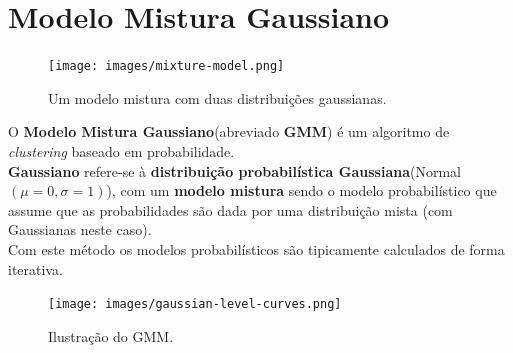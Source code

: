 \documentclass[]{report}
\begin{document}
\section{Modelo Mistura Gaussiano}
\begin{figure}
    \begin{center}
        \vspace{-20pt}
        \texttt{[image: images/mixture-model.png]}
        \caption{Um modelo mistura com duas distribuições gaussianas.}
    \end{center}
    \vspace{-50pt}
\end{figure}
O \textbf{Modelo Mistura Gaussiano}(abreviado \textbf{GMM}) é um algoritmo de \textit{clustering} baseado em probabilidade.\\
\textbf{Gaussiano} refere-se à \textbf{distribuição probabilística Gaussiana}(Normal $(\mu=0, \sigma=1)$), com um \textbf{modelo mistura} sendo o modelo probabilístico que assume que as probabilidades são dada por uma distribuição mista (com Gaussianas neste caso).\\
Com este método os modelos probabilísticos são tipicamente calculados de forma iterativa.
\begin{figure}[ht]
\captionsetup{singlelinecheck = false, justification=justified}
\texttt{[image: images/gaussian-level-curves.png]}
\caption{Ilustração do GMM.}
\end{figure}
\end{document}
